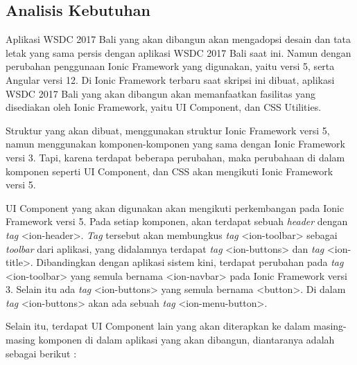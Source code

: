 \subsection{Analisis Kebutuhan}
\label{sec:analisisKebutuhanSistem}
Aplikasi WSDC 2017 Bali yang akan dibangun akan mengadopsi desain dan tata letak yang sama persis dengan aplikasi WSDC 2017 Bali saat ini. Namun dengan perubahan penggunaan Ionic Framework yang digunakan, yaitu versi 5, serta Angular versi 12. Di Ionic Framework terbaru saat skripsi ini dibuat, aplikasi WSDC 2017 Bali yang akan dibangun akan memanfaatkan fasilitas yang disediakan oleh Ionic Framework, yaitu UI Component, dan CSS Utilities. 

Struktur yang akan dibuat, menggunakan struktur Ionic Framework versi 5, namun menggunakan komponen-komponen yang sama dengan Ionic Framework versi 3. Tapi, karena terdapat beberapa perubahan, maka perubahaan di dalam komponen seperti UI Component, dan CSS akan mengikuti Ionic Framework versi 5. 

UI Component yang akan digunakan akan mengikuti perkembangan pada Ionic Framework versi 5. Pada setiap komponen, akan terdapat sebuah \textit{header} dengan \textit{tag} <ion-header>. \textit{Tag} tersebut akan membungkus \textit{tag} <ion-toolbar> sebagai \textit{toolbar} dari aplikasi, yang didalamnya terdapat \textit{tag} <ion-buttons> dan \textit{tag} <ion-title>. Dibandingkan dengan aplikasi sistem kini, terdapat perubahan pada \textit{tag} <ion-toolbar> yang semula bernama <ion-navbar> pada Ionic Framework versi 3. Selain itu ada \textit{tag} <ion-buttons> yang semula bernama <button>. Di dalam \textit{tag} <ion-buttons> akan ada sebuah \textit{tag} <ion-menu-button>.

\newpage

Selain itu, terdapat UI Component lain yang akan diterapkan ke dalam masing-masing komponen di dalam aplikasi yang akan dibangun, diantaranya adalah sebagai berikut :

